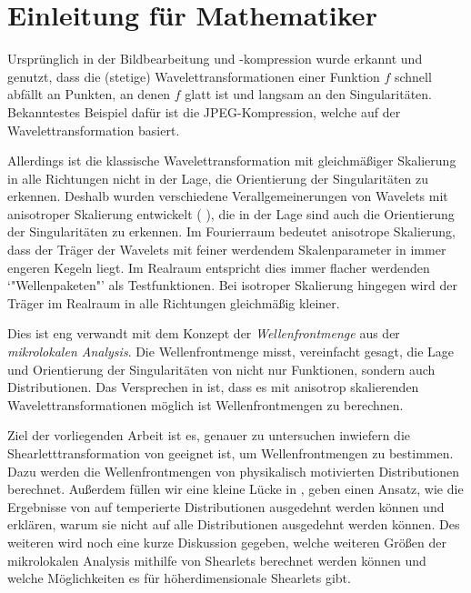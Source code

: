 \chapter{Einleitung für Mathematiker} %
\label{sec:einleitung_mathematik}

Ursprünglich in der Bildbearbeitung und -kompression wurde erkannt und genutzt, dass die (stetige) Wavelettransformationen einer Funktion $f$ schnell abfällt an Punkten, an denen $f$ glatt ist und langsam an den Singularitäten. Bekanntestes Beispiel dafür ist die JPEG-Kompression, welche auf der Wavelettransformation basiert.

Allerdings ist die klassische Wavelettransformation mit gleichmäßiger Skalierung in alle Richtungen nicht in der Lage, die Orientierung der Singularitäten zu erkennen. Deshalb wurden verschiedene Verallgemeinerungen von Wavelets mit anisotroper Skalierung entwickelt (\cite{Guo2006} \cite{Kutyniok2008} \cite{Candes2005}), die in der Lage sind auch die Orientierung der Singularitäten zu erkennen. Im Fourierraum bedeutet anisotrope Skalierung, dass der Träger der Wavelets mit feiner werdendem Skalenparameter in immer engeren Kegeln liegt. Im Realraum entspricht dies immer flacher werdenden `"Wellenpaketen"' als Testfunktionen. Bei isotroper Skalierung hingegen wird der Träger im Realraum in alle Richtungen gleichmäßig kleiner.

Dies ist eng verwandt mit dem Konzept der \emph{Wellenfrontmenge} aus der \emph{mikrolokalen Analysis}. Die Wellenfrontmenge misst, vereinfacht gesagt, die Lage und Orientierung der Singularitäten von nicht nur Funktionen, sondern auch Distributionen. Das Versprechen in \cite{Kutyniok2008} ist, dass es mit anisotrop skalierenden Wavelettransformationen möglich ist Wellenfrontmengen zu berechnen.

Ziel der vorliegenden Arbeit ist es, genauer zu untersuchen inwiefern die Shearletttransformation von \textcite{Kutyniok2008} geeignet ist, um Wellenfrontmengen zu bestimmen. Dazu werden die Wellenfrontmengen von physikalisch motivierten Distributionen berechnet. Außerdem füllen wir eine kleine Lücke in \cite{Kutyniok2008}, geben einen Ansatz, wie die Ergebnisse von \textcite{Kutyniok2008} auf temperierte Distributionen ausgedehnt werden können und erklären, warum sie nicht auf alle Distributionen ausgedehnt werden können.
Des weiteren wird noch eine kurze Diskussion gegeben, welche weiteren Größen der mikrolokalen Analysis mithilfe von Shearlets berechnet werden können und welche Möglichkeiten es für höherdimensionale Shearlets gibt.


